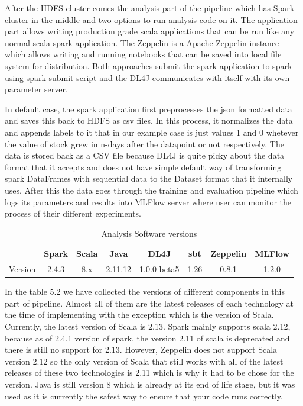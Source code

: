 After the HDFS cluster comes the analysis part of the pipeline which has Spark cluster in the middle and two options to run analysis code on it.
The application part allows writing production grade scala applications that can be run like any normal scala spark application.
The Zeppelin is a Apache Zeppelin instance which allows writing and running notebooks that can be saved into local file system for distribution.
Both approaches submit the spark application to spark using spark-submit script and the DL4J communicates with itself with its own parameter server.

In default case, the spark application first preprocesses the json formatted data and saves this back to HDFS as csv files.
In this process, it normalizes the data and appends labels to it that in our example case is just values 1 and 0 whetever the value of stock grew in n-days after the datapoint or not respectively.
The data is stored back as a CSV file because DL4J is quite picky about the data format that it accepts and does not have simple default way of transforming spark DataFrames with sequential data to the Dataset format that it internally uses.
After this the data goes through the training and evaluation pipeline which logs its parameters and results into MLFlow server where user can monitor the process of their different experiments.

\begin{table}[! htbp]\centering
    \caption{Analysis Software versions}
    \begin{threeparttable}
        \begin{tabular}{|c|c|c|c|c|c|c|c|} 
        \hline
        & Spark & Scala & Java & DL4J & sbt & Zeppelin & MLFlow \\ \hline
        Version & 2.4.3 & 8.x & 2.11.12 & 1.0.0-beta5 & 1.26 & 0.8.1 & 1.2.0\\
        \hline
        \end{tabular}
    \end{threeparttable}
\end{table}

In the table 5.2 we have collected the versions of different components in this part of pipeline.
Almost all of them are the latest releases of each technology at the time of implementing with the exception which is the version of Scala.
Currently, the latest version of Scala is 2.13.
Spark mainly supports scala 2.12, because as of 2.4.1 version of spark, the version 2.11 of scala is deprecated and there is still no support for 2.13.
However, Zeppelin does not support Scala version 2.12 so the only version of Scala that still works with all of the latest releases of these two technologies is 2.11 which is why it had to be chose for the version.
Java is still version 8 which is already at its end of life stage, but it was used as it is currently the safest way to ensure that your code runs correctly.

